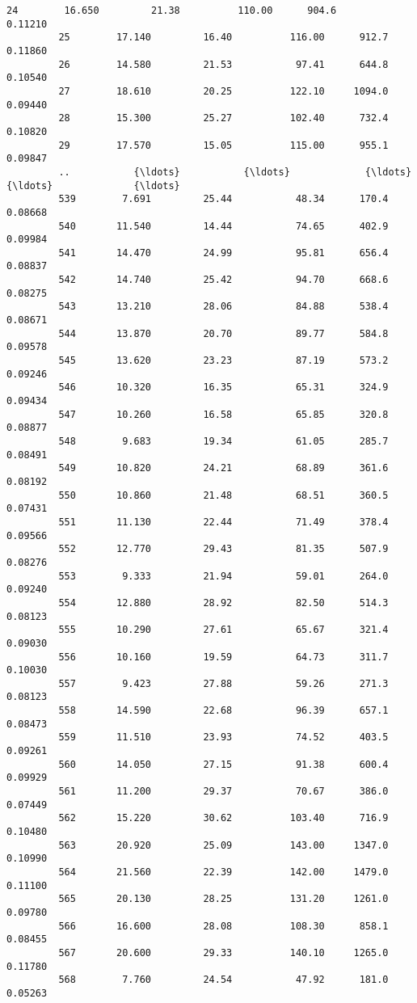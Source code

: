 \documentclass[11pt]{article}
\begin{document}
\begin{Verbatim}[commandchars=\\\{\}]
         24        16.650         21.38          110.00      904.6          0.11210   
         25        17.140         16.40          116.00      912.7          0.11860   
         26        14.580         21.53           97.41      644.8          0.10540   
         27        18.610         20.25          122.10     1094.0          0.09440   
         28        15.300         25.27          102.40      732.4          0.10820   
         29        17.570         15.05          115.00      955.1          0.09847   
         ..           {\ldots}           {\ldots}             {\ldots}        {\ldots}              {\ldots}   
         539        7.691         25.44           48.34      170.4          0.08668   
         540       11.540         14.44           74.65      402.9          0.09984   
         541       14.470         24.99           95.81      656.4          0.08837   
         542       14.740         25.42           94.70      668.6          0.08275   
         543       13.210         28.06           84.88      538.4          0.08671   
         544       13.870         20.70           89.77      584.8          0.09578   
         545       13.620         23.23           87.19      573.2          0.09246   
         546       10.320         16.35           65.31      324.9          0.09434   
         547       10.260         16.58           65.85      320.8          0.08877   
         548        9.683         19.34           61.05      285.7          0.08491   
         549       10.820         24.21           68.89      361.6          0.08192   
         550       10.860         21.48           68.51      360.5          0.07431   
         551       11.130         22.44           71.49      378.4          0.09566   
         552       12.770         29.43           81.35      507.9          0.08276   
         553        9.333         21.94           59.01      264.0          0.09240   
         554       12.880         28.92           82.50      514.3          0.08123   
         555       10.290         27.61           65.67      321.4          0.09030   
         556       10.160         19.59           64.73      311.7          0.10030   
         557        9.423         27.88           59.26      271.3          0.08123   
         558       14.590         22.68           96.39      657.1          0.08473   
         559       11.510         23.93           74.52      403.5          0.09261   
         560       14.050         27.15           91.38      600.4          0.09929   
         561       11.200         29.37           70.67      386.0          0.07449   
         562       15.220         30.62          103.40      716.9          0.10480   
         563       20.920         25.09          143.00     1347.0          0.10990   
         564       21.560         22.39          142.00     1479.0          0.11100   
         565       20.130         28.25          131.20     1261.0          0.09780   
         566       16.600         28.08          108.30      858.1          0.08455   
         567       20.600         29.33          140.10     1265.0          0.11780   
         568        7.760         24.54           47.92      181.0          0.05263   
         

\end{Verbatim}
\end{document}
